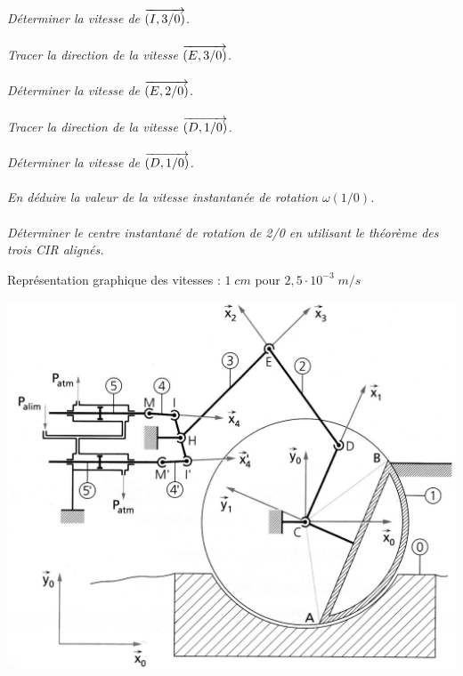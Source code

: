 \documentclass[11pt,oneside]{article}
\begin{document}
\paragraph{}
\textit{Déterminer la vitesse de $\overrightarrow{(I,3/ 0)}$.}

\paragraph{}
\textit{Tracer la direction de la vitesse $\overrightarrow{(E,3/ 0)}$.}

\paragraph{}
\textit{Déterminer la vitesse de $\overrightarrow{(E,2/ 0)}$.}

\paragraph{}
\textit{Tracer la direction de la vitesse $\overrightarrow{(D,1/ 0)}$.}

\paragraph{}
\textit{Déterminer la vitesse de $\overrightarrow{(D,1/ 0)}$.}

\paragraph{}
\textit{En déduire la valeur de la vitesse instantanée de rotation $\omega(1/0)$.}

\paragraph{}
\textit{Déterminer le centre instantané de rotation de 2/0 en utilisant le théorème des trois
CIR alignés.}

\newpage

Représentation graphique des vitesses : $1 \; cm$ pour $2,5\cdot10^{-3} \; m/s$

\vfill

\begin{center}
\includegraphics[width=.9\textwidth]{png/img2}
\end{center}
\end{document}
